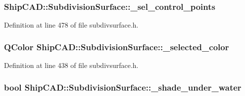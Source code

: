 \subsubsection[{\texorpdfstring{\+\_\+sel\+\_\+control\+\_\+points}{_sel_control_points}}]{ Ship\+C\+A\+D\+::\+Subdivision\+Surface\+::\+\_\+sel\+\_\+control\+\_\+points\hspace{0.3cm}{\ttfamily [protected]}}\hypertarget{classShipCAD_1_1SubdivisionSurface_a891ade2e87969ef453edcf712b1fe276}{}\label{classShipCAD_1_1SubdivisionSurface_a891ade2e87969ef453edcf712b1fe276}


Definition at line 478 of file subdivsurface.\+h.

\subsubsection[{\texorpdfstring{\+\_\+selected\+\_\+color}{_selected_color}}]{\setlength{\rightskip}{0pt plus 5cm}Q\+Color Ship\+C\+A\+D\+::\+Subdivision\+Surface\+::\+\_\+selected\+\_\+color\hspace{0.3cm}{\ttfamily [protected]}}\hypertarget{classShipCAD_1_1SubdivisionSurface_a3cfcbbe769216c753330f71e57a4cf4d}{}\label{classShipCAD_1_1SubdivisionSurface_a3cfcbbe769216c753330f71e57a4cf4d}


Definition at line 438 of file subdivsurface.\+h.

\subsubsection[{\texorpdfstring{\+\_\+shade\+\_\+under\+\_\+water}{_shade_under_water}}]{\setlength{\rightskip}{0pt plus 5cm}bool Ship\+C\+A\+D\+::\+Subdivision\+Surface\+::\+\_\+shade\+\_\+under\+\_\+water\hspace{0.3cm}{\ttfamily [protected]}}\hypertarget{classShipCAD_1_1SubdivisionSurface_ac3294d41679de31e588d603e3428565e}{}\label{classShipCAD_1_1SubdivisionSurface_ac3294d41679de31e588d603e3428565e}


